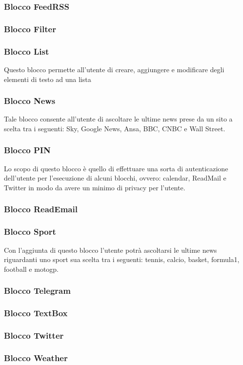 \subsubsection{Blocco FeedRSS}
\subsubsection{Blocco Filter}
\subsubsection{Blocco List}
Questo blocco permette all'utente di creare, aggiungere e modificare degli elementi di testo ad una lista
\subsubsection{Blocco News}
Tale blocco consente all'utente di ascoltare le ultime news prese da un sito a scelta tra i seguenti: Sky, Google News, Ansa, BBC, CNBC e Wall Street.
\subsubsection{Blocco PIN}
Lo scopo di questo blocco è quello di effettuare una sorta di autenticazione dell'utente per l'esecuzione di alcuni blocchi, ovvero: calendar, ReadMail e Twitter in modo da avere un minimo di privacy per l'utente.
\subsubsection{Blocco ReadEmail}
\subsubsection{Blocco Sport}
Con l'aggiunta di questo blocco l'utente potrà ascoltarsi le ultime news riguardanti uno sport sua scelta tra i seguenti: tennis, calcio, basket, formula1, football e motogp.
\subsubsection{Blocco Telegram}
\subsubsection{Blocco TextBox}
\subsubsection{Blocco Twitter}
\subsubsection{Blocco Weather}